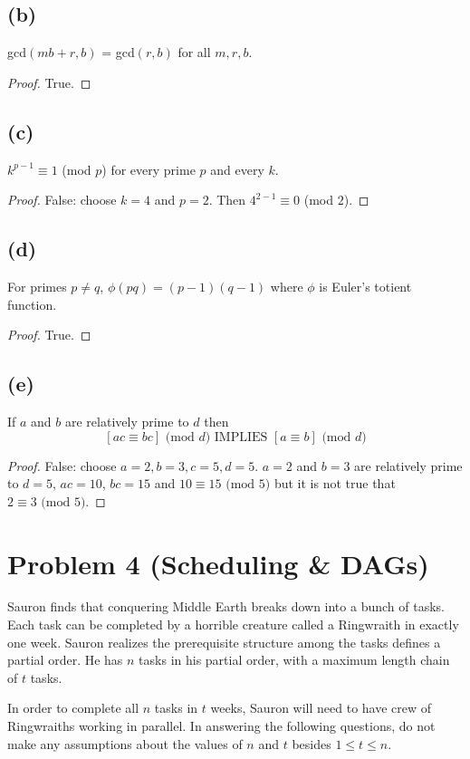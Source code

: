 \documentclass[14pt]{extarticle}
\begin{document}
\subsection{(b)}
gcd$(mb+r, b)$ = gcd$(r,b)$ for all $m, r, b$.
\begin{proof}
True.
\end{proof}

\subsection{(c)}
$k^{p-1} \equiv 1$ (mod $p$) for every prime $p$ and every $k$.
\begin{proof}
False: choose $k = 4$ and $p = 2$. Then $4^{2-1} \equiv 0$ (mod $2$).
\end{proof}

\subsection{(d)}
For primes $p \neq q$, $\phi(pq) = (p-1)(q-1)$ where $\phi$ is Euler's totient function.
\begin{proof}
True.
\end{proof}

\subsection{(e)}
If $a$ and $b$ are relatively prime to $d$ then
$$
[ac \equiv bc] \text{ (mod $d$)} \text{ IMPLIES } [a \equiv b] \text{ (mod $d$)}
$$
\begin{proof}
False: choose $a = 2, b = 3, c = 5, d = 5$. $a = 2$ and $b = 3$ are relatively prime to $d = 5$, $ac = 10$, $bc = 15$ and $10 \equiv 15 \text{ (mod $5$)}$ but it is not true that $2 \equiv 3 \text{ (mod $5$)}$.
\end{proof}

\section{Problem 4 (Scheduling \& DAGs)}
Sauron finds that conquering Middle Earth breaks down into a bunch of tasks. Each task can be completed by a horrible creature called a Ringwraith in exactly one week. Sauron realizes the prerequisite structure among the tasks defines a partial order. He has $n$ tasks in his partial order, with a maximum length chain of $t$ tasks.

In order to complete all $n$ tasks in $t$ weeks, Sauron will need to have crew of Ringwraiths working in parallel. In answering the following questions, do not make any assumptions about the values of $n$ and $t$ besides $1 \leq t \leq n$.
\end{document}
